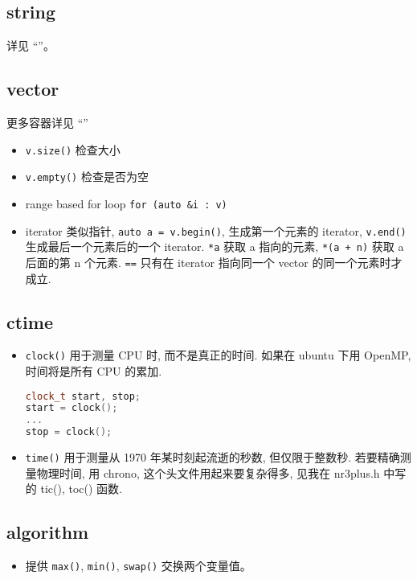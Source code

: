 
\subsection{string}
详见 “”。

\subsection{vector}
更多容器详见 “”
\begin{itemize}
\item \verb`v.size()` 检查大小
\item \verb`v.empty()` 检查是否为空
\item range based for loop \verb`for (auto &i : v)`
\item iterator 类似指针, \verb`auto a = v.begin()`, 生成第一个元素的 iterator, \verb`v.end()` 生成最后一个元素后的一个 iterator. \verb`*a` 获取 a 指向的元素, \verb`*(a + n)` 获取 a 后面的第 n 个元素. \verb`==` 只有在 iterator 指向同一个 vector 的同一个元素时才成立.
\end{itemize}

\subsection{ctime}
\begin{itemize}
\item \verb`clock()` 用于测量 CPU 时, 而不是真正的时间. 如果在 ubuntu 下用 OpenMP, 时间将是所有 CPU 的累加.
\begin{lstlisting}[language=cpp]
clock_t start, stop;
start = clock();
...
stop = clock();
\end{lstlisting}
\item \verb`time()` 用于测量从 1970 年某时刻起流逝的秒数, 但仅限于整数秒.
若要精确测量物理时间, 用 chrono, 这个头文件用起来要复杂得多, 见我在 nr3plus.h 中写的 tic(), toc() 函数.
\end{itemize}

\subsection{algorithm}
\begin{itemize}
\item 提供 \verb`max()`, \verb`min()`, \verb`swap()` 交换两个变量值。
\end{itemize}


